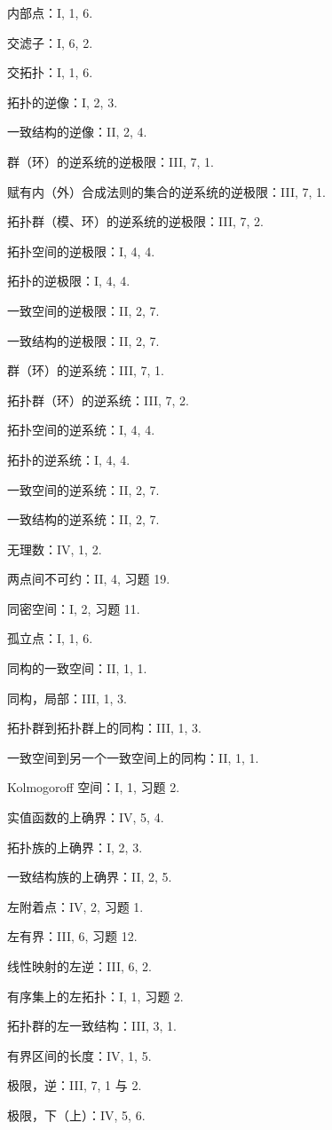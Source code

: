 内部点：I, 1, 6.

交滤子：I, 6, 2.

交拓扑：I, 1, 6.

拓扑的逆像：I, 2, 3.

一致结构的逆像：II, 2, 4.

群（环）的逆系统的逆极限：III, 7, 1.

赋有内（外）合成法则的集合的逆系统的逆极限：III, 7, 1.

拓扑群（模、环）的逆系统的逆极限：III, 7, 2.

拓扑空间的逆极限：I, 4, 4.

拓扑的逆极限：I, 4, 4.

一致空间的逆极限：II, 2, 7.

一致结构的逆极限：II, 2, 7.

群（环）的逆系统：III, 7, 1.

拓扑群（环）的逆系统：III, 7, 2.

拓扑空间的逆系统：I, 4, 4.

拓扑的逆系统：I, 4, 4.

一致空间的逆系统：II, 2, 7.

一致结构的逆系统：II, 2, 7.

无理数：IV, 1, 2.

两点间不可约：II, 4, 习题 19.

同密空间：I, 2, 习题 11.

孤立点：I, 1, 6.

同构的一致空间：II, 1, 1.

同构，局部：III, 1, 3.

拓扑群到拓扑群上的同构：III, 1, 3.

一致空间到另一个一致空间上的同构：II, 1, 1.

Kolmogoroff 空间：I, 1, 习题 2.

实值函数的上确界：IV, 5, 4.

拓扑族的上确界：I, 2, 3.

一致结构族的上确界：II, 2, 5.

左附着点：IV, 2, 习题 1.

左有界：III, 6, 习题 12.

线性映射的左逆：III, 6, 2.

有序集上的左拓扑：I, 1, 习题 2.

拓扑群的左一致结构：III, 3, 1.

有界区间的长度：IV, 1, 5.

极限，逆：III, 7, 1 与 2.

极限，下（上）：IV, 5, 6.

